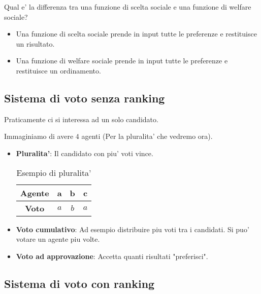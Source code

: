 Qual e' la differenza tra una funzione di scelta sociale e una funzione di
welfare sociale?

\begin{itemize}
    \item Una funzione di scelta sociale prende in input tutte le preferenze e
          restituisce un risultato.
    \item Una funzione di welfare sociale prende in input tutte le preferenze e
          restituisce un ordinamento.
\end{itemize}

\subsection{Sistema di voto senza ranking}

Praticamente ci si interessa ad un solo candidato.

Immaginiamo di avere $4$ agenti (Per la pluralita' che vedremo ora).
\begin{itemize}
    \item \textbf{Pluralita'}: Il candidato con piu' voti vince.
          \begin{table}[H]
              \centering
              \begin{tabular}{|c|c|c|c|}
                  \hline
                  \textbf{Agente} & \textbf{a} & \textbf{b} & \textbf{c} \\
                  \hline
                  \textbf{Voto}   & $a$        & $b$        & $a$        \\
                  \hline
              \end{tabular}
              \caption{Esempio di pluralita'}
              \label{tab:my_label}
          \end{table}

    \item \textbf{Voto cumulativo}: Ad esempio distribuire piu voti tra i candidati. Si puo' votare un agente piu volte.
          \begin{table}

          \end{table}
    \item \textbf{Voto ad approvazione}: Accetta quanti risultati "preferisci".
\end{itemize}

\subsection{Sistema di voto con ranking}

